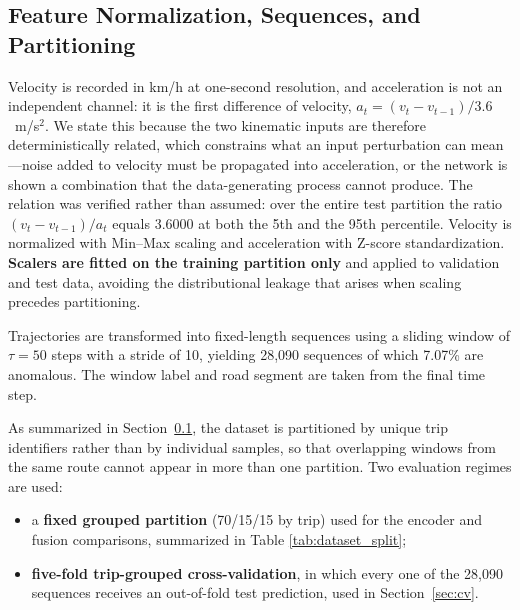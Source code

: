 \documentclass[journal]{IEEEtran}
\begin{document}
\subsection{Feature Normalization, Sequences, and Partitioning}
\label{sec:dataset_split}
Velocity is recorded in km/h at one-second resolution, and acceleration is not an independent channel: it is the first difference of velocity, $a_t = (v_t - v_{t-1})/3.6$~m/s$^2$. We state this because the two kinematic inputs are therefore deterministically related, which constrains what an input perturbation can mean---noise added to velocity must be propagated into acceleration, or the network is shown a combination that the data-generating process cannot produce. The relation was verified rather than assumed: over the entire test partition the ratio $(v_t - v_{t-1})/a_t$ equals $3.6000$ at both the 5th and the 95th percentile. Velocity is normalized with Min--Max scaling and acceleration with Z-score standardization. \textbf{Scalers are fitted on the training partition only} and applied to validation and test data, avoiding the distributional leakage that arises when scaling precedes partitioning.

Trajectories are transformed into fixed-length sequences using a sliding window of $\tau = 50$ steps with a stride of 10, yielding 28{,}090 sequences of which 7.07\% are anomalous. The window label and road segment are taken from the final time step.

As summarized in Section~\ref{sec:dataset_split}, the dataset is partitioned by unique trip identifiers rather than by individual samples, so that overlapping windows from the same route cannot appear in more than one partition. Two evaluation regimes are used:
\begin{itemize}
  \item a \textbf{fixed grouped partition} (70/15/15 by trip) used for the encoder and fusion comparisons, summarized in Table \ref{tab:dataset_split};
  \item \textbf{five-fold trip-grouped cross-validation}, in which every one of the 28{,}090 sequences receives an out-of-fold test prediction, used in Section~\ref{sec:cv}.
\end{itemize}

\begin{table}[!htbp]
  \centering
  \caption{Fixed grouped partition and anomaly distribution}
  \label{tab:dataset_split}
  \renewcommand{\arraystretch}{1.2}
\end{table}
\end{document}
